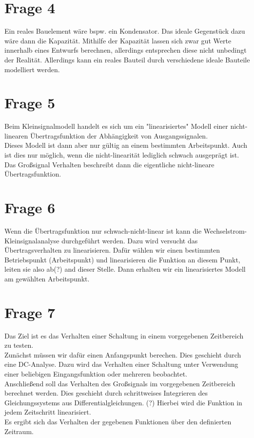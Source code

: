 \documentclass[a4paper]{scrartcl}
\begin{document}
\section*{Frage 4}
Ein reales Bauelement wäre bspw. ein Kondensator. Das ideale Gegenstück dazu wäre dann die Kapazität. Mithilfe der Kapazität lassen sich zwar gut Werte innerhalb eines Entwurfs berechnen, allerdings entsprechen diese nicht unbedingt der Realität. Allerdings kann ein reales Bauteil durch verschiedene ideale Bauteile modelliert werden.




\section*{Frage 5}
Beim Kleinsignalmodell handelt es sich um ein "linearisiertes" Modell einer nicht-linearen Übertragsfunktion der Abhängigkeit von Ausgangssignalen.\\
Dieses Modell ist dann aber nur gültig an einem bestimmten Arbeitspunkt. Auch ist dies nur möglich, wenn die nicht-linearität lediglich schwach ausgeprägt ist.\\
Das Großsignal Verhalten beschreibt dann die eigentliche nicht-lineare Übertragsfunktion.


\section*{Frage 6}
Wenn die Übertragsfunktion nur schwach-nicht-linear ist kann die Wechselstrom-Kleinsignalanalyse durchgeführt werden. Dazu wird versucht das Übertragsverhalten zu linearisieren. Dafür wählen wir einen bestimmten Betriebspunkt (Arbeitspunkt) und linearisieren die Funktion an diesem Punkt, leiten sie also ab(?) and dieser Stelle. Dann erhalten wir ein linearisiertes Modell am gewählten Arbeitspunkt.




\section*{Frage 7}
Das Ziel ist es das Verhalten einer Schaltung in einem vorgegebenen Zeitbereich zu testen.\\
Zunächst müssen wir dafür einen Anfangspunkt berechen. Dies geschieht durch eine DC-Analyse. Dazu wird das Verhalten einer Schaltung unter Verwendung einer beliebigen Eingangsfunktion oder mehreren beobachtet.\\
Anschließend soll das Verhalten des Großsignals im vorgegebenen Zeitbereich berechnet werden. Dies geschieht durch schrittweises Integrieren des Gleichungssystems aus Differentialgleichungen. (?)%
Hierbei wird die Funktion in jedem Zeitschritt linearisiert.\\
Es ergibt sich das Verhalten der gegebenen Funktionen über den definierten Zeitraum.
\end{document}
